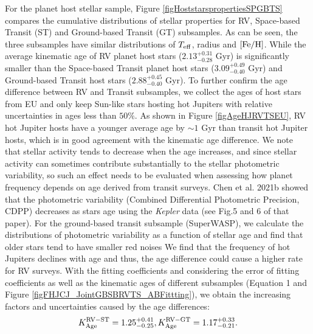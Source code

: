 \documentclass[twocolumn]{pnas-new}
\begin{document}
For the planet host stellar sample, Figure \ref{figHoststarspropertiesSPGBTS} compares the cumulative distributions of stellar properties for RV, Space-based Transit (ST) and Ground-based Transit (GT) subsamples.
As can be seen, the three subsamples have similar
distributions of $T_{\rm eff}$, radius and $\rm [Fe/H]$.
While the average kinematic age of RV planet host stars ($2.13^{+0.31}_{-0.28}$ Gyr) is significantly smaller than the Space-based Transit planet host stars ($3.09^{+0.49}_{-0.40}$ Gyr) and Ground-based Transit host stars ($2.88^{+0.45}_{-0.40}$ Gyr).
To further confirm the age difference between RV and Transit subsamples, we collect the ages of host stars from EU and only keep Sun-like stars hosting hot Jupiters with relative uncertainties in ages less than $50\%$.
As shown in Figure \ref{figAgeHJRVTSEU}, RV hot Jupiter hosts have a younger average age by $\sim 1$ Gyr than transit hot Jupiter hosts, which is in good agreement with the kinematic age difference.
{We note that stellar activity tends to decrease when the age increases, and since stellar activity can sometimes contribute substantially to the stellar photometric variability, so such an effect needs to be evaluated when assessing how planet frequency depends on age derived from transit surveys.}
{Chen et al. 2021b \citep{2021AJ....162..100C} showed that the photometric variability (Combined Differential Photometric Precision, CDPP) decreases as stars age using the {\it Kepler} data (see Fig.5 and 6 of that paper). 
For the ground-based transit subsample (SuperWASP),  we calculate the distributions of photometric variability as a function of stellar age and find that older stars tend to have smaller red noises}
We find that the frequency of hot Jupiters declines with age and thus, the age difference could cause a higher rate for RV surveys.
With the fitting coefficients and considering the error of fitting coefficients as well as the kinematic ages of different subsamples (Equation 1 and Figure \ref{figFHJCJ_JointGBSBRVTS_ABFittting}), we obtain the increasing factors and uncertainties caused by the age differences:
\begin{equation}
  K^{\rm RV-ST}_{\rm Age} = 1.25^{+0.41}_{-0.25}, 
  K^{\rm RV-GT}_{\rm Age} = 1.17^{+0.33}_{-0.21}. 
\end{equation}
\end{document}

